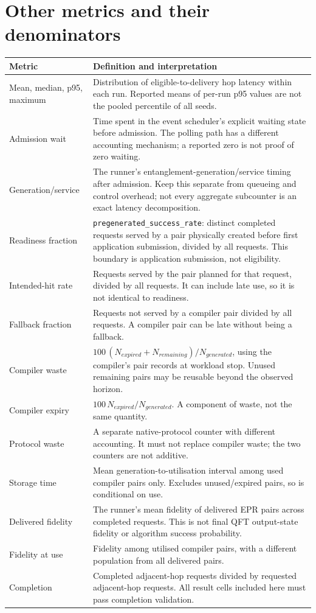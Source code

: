 \documentclass[11pt,a4paper,oneside]{report}
\begin{document}
\section{Other metrics and their denominators}
\begin{longtable}{p{.27\linewidth}p{.65\linewidth}}
\toprule Metric & Definition and interpretation\\\midrule\endhead
Mean, median, p95, maximum & Distribution of eligible-to-delivery hop latency within each run. Reported means of per-run p95 values are not the pooled percentile of all seeds.\\
Admission wait & Time spent in the event scheduler's explicit waiting state before admission. The polling path has a different accounting mechanism; a reported zero is not proof of zero waiting.\\
Generation/service & The runner's entanglement-generation/service timing after admission. Keep this separate from queueing and control overhead; not every aggregate subcounter is an exact latency decomposition.\\
Readiness fraction & \texttt{pregenerated\_success\_rate}: distinct completed requests served by a pair physically created before first application submission, divided by all requests. This boundary is application submission, not eligibility.\\
Intended-hit rate & Requests served by the pair planned for that request, divided by all requests. It can include late use, so it is not identical to readiness.\\
Fallback fraction & Requests not served by a compiler pair divided by all requests. A compiler pair can be late without being a fallback.\\
Compiler waste & $100\,(N_{expired}+N_{remaining})/N_{generated}$, using the compiler's pair records at workload stop. Unused remaining pairs may be reusable beyond the observed horizon.\\
Compiler expiry & $100\,N_{expired}/N_{generated}$. A component of waste, not the same quantity.\\
Protocol waste & A separate native-protocol counter with different accounting. It must not replace compiler waste; the two counters are not additive.\\
Storage time & Mean generation-to-utilisation interval among used compiler pairs only. Excludes unused/expired pairs, so is conditional on use.\\
Delivered fidelity & The runner's mean fidelity of delivered EPR pairs across completed requests. This is not final QFT output-state fidelity or algorithm success probability.\\
Fidelity at use & Fidelity among utilised compiler pairs, with a different population from all delivered pairs.\\
Completion & Completed adjacent-hop requests divided by requested adjacent-hop requests. All result cells included here must pass completion validation.\\
\bottomrule
\end{longtable}
\end{document}
